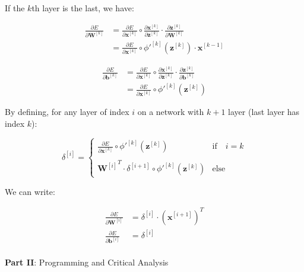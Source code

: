 \documentclass[12pt]{article}
\begin{document}
\begin{enumerate}[leftmargin=\labelsep]
    If the $k$th layer is the last, we have:

    \begin{equation}
    \begin{aligned}
        \frac{\partial E}{\partial \mathbf{W}^{[k]}} &= \frac{\partial E}{\partial \mathbf{x}^{[k]}} \circ \frac{\partial \mathbf{x}^{[k]}}{\partial \mathbf{z}^{[k]}} \cdot \frac{\partial \mathbf{z}^{[k]}}{\partial \mathbf{W}^{[k]}} \\
        &= \frac{\partial E}{\partial \mathbf{x}^{[k]}} \circ \phi'^{[k]}(\mathbf{z}^{[k]}) \cdot \mathbf{x}^{[k-1]}
    \end{aligned}
    \end{equation}

    \begin{equation}
    \begin{aligned}
        \frac{\partial E}{\partial \mathbf{b}^{[k]}} &= \frac{\partial E}{\partial \mathbf{x}^{[k]}} \circ \frac{\partial \mathbf{x}^{[k]}}{\partial \mathbf{z}^{[k]}} \cdot \frac{\partial \mathbf{z}^{[k]}}{\partial \mathbf{b}^{[k]}} \\
        &= \frac{\partial E}{\partial \mathbf{x}^{[k]}} \circ \phi'^{[k]}(\mathbf{z}^{[k]})
    \end{aligned}
    \end{equation}

    By defining, for any layer of index $i$ on a network with $k+1$ layer (last layer has index $k$):

    \begin{equation}
        \delta^{[i]} = \left\{
        \begin{array}{ll}
            \frac{\partial E}{\partial \mathbf{x}^{[k]}} \circ \phi'^{[k]}(\mathbf{z}^{[k]}) & \textrm{if} \quad i = k \\
            \\
            {\mathbf{W}^{[i]}}^T \cdot \delta^{[i+1]} \circ \phi'^{[k]}(\mathbf{z}^{[k]})  & \textrm{else}
        \end{array} 
        \right.
    \end{equation}

    We can write:

    \begin{equation}
    \begin{aligned}
        \frac{\partial E}{\partial \mathbf{W}^{[i]}} &= \delta^{[i]} \cdot {(\mathbf{x}^{[i+1]})}^T \\
        \frac{\partial E}{\partial \mathbf{b}^{[i]}} &= \delta^{[i]} \\
    \end{aligned}
    \end{equation}

\end{enumerate}

\vskip 1cm

\large{\textbf{Part II}: Programming and Critical Analysis}\normalsize
\end{document}
